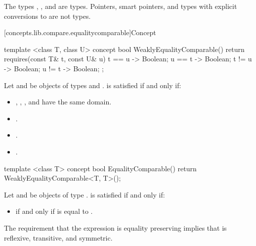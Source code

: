 \pnum \enterexample The types , , and
 are  types.
Pointers, smart pointers, and types with explicit conversions to  are
not  types.\exitexample

[concepts.lib.compare.equalitycomparable]{Concept }

%
\begin{itemdecl}
template <class T, class U>
concept bool WeaklyEqualityComparable() {
  return requires(const T& t, const U& u) {
    { t == u } -> Boolean;
    { u == t } -> Boolean;
    { t != u } -> Boolean;
    { u != t } -> Boolean;
  };
}
\end{itemdecl}

\begin{itemdescr}
\pnum
Let  and  be objects of types  and .
 is satisfied if and only if:
\begin{itemize}
\item {}, , , and 
      have the same domain.
\item {}.
\item {}.
\item {}.
\end{itemize}
\end{itemdescr}

%
\begin{itemdecl}
template <class T>
concept bool EqualityComparable() {
  return WeaklyEqualityComparable<T, T>();
}
\end{itemdecl}

\begin{itemdescr}
\pnum
Let  and  be objects
of type . 
is satisfied if and only if:

\begin{itemize}
\item {} if and only if  is equal to .
\end{itemize}

\pnum
\enternote The requirement that the expression  is equality preserving
implies that \tcode{==} is reflexive, transitive, and symmetric.\exitnote
\end{itemdescr}

